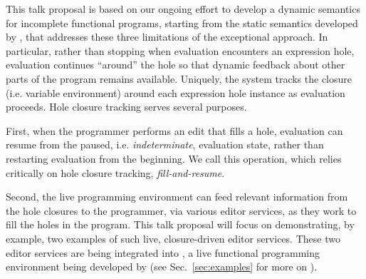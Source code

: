 

This talk proposal is based on our ongoing effort to develop a dynamic semantics for incomplete functional programs, starting from the static semantics developed by \citet{popl-paper},  that addresses these three limitations of the exceptional approach. 
In particular, rather than stopping when evaluation encounters an expression hole, evaluation continues ``around'' the hole so that dynamic feedback about other parts of the program remains available. 
Uniquely, the system tracks the closure (i.e. variable environment) around each expression hole instance as evaluation proceeds. Hole closure tracking serves several purposes. 

First, when the programmer performs an edit that fills a hole, evaluation can resume from the paused, i.e. \emph{indeterminate}, evaluation state, rather than restarting evaluation from the beginning. We call this operation, which relies critically on hole closure tracking, \emph{fill-and-resume}.

Second, the live programming environment can feed relevant information from the {hole closures} to the programmer, via various editor services, as they work to fill the holes in the program. 
This talk proposal will focus on demonstrating, by example, two examples of such live, closure-driven editor services. These two editor services are being integrated into \Hazel, a live functional programming environment being developed by \citet{HazelnutSNAPL} (see Sec.~\ref{sec:examples} for more on \Hazel). 

